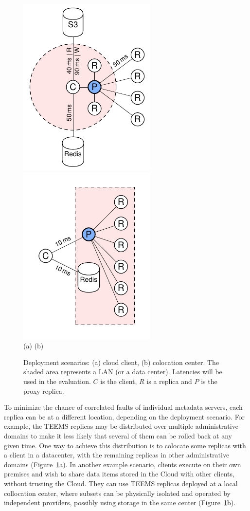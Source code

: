 \begin{figure}[t] \centering
        \includegraphics[width=.32\linewidth]{ps/diag-2}
        \includegraphics[width=.32\linewidth]{ps/diag-3}\\
        (a) \hspace{2.7cm} (b)
    \caption{Deployment scenarios: (a) cloud client, (b) colocation center. The shaded area represents a
    LAN (or a data center). Latencies will be used in the evaluation.
    $C$ is the client, $R$ is a replica and $P$ is the proxy replica.
    }\label{fig:deployments}
\end{figure}


To minimize the chance of correlated faults of individual metadata
servers, each replica can be at a different location, depending on the
deployment scenario. For example, the \ac{TEEMS} replicas may be
distributed over multiple administrative domains to make it less
likely that several of them can be rolled back at any given time. One
way to achieve this distribution is to colocate some replicas with a
client in a datacenter, with the remaining replicas in other
administrative domains (Figure~\ref{fig:deployments}a).  In another
example scenario, clients execute on their own premises and wish to
share data items stored in the Cloud with other clients, without
trusting the Cloud. They can use \ac{TEEMS} replicas deployed at a local
collocation center, where subsets can be physically isolated and
operated by independent providers, possibly using storage in the same
center (Figure~\ref{fig:deployments}b).

